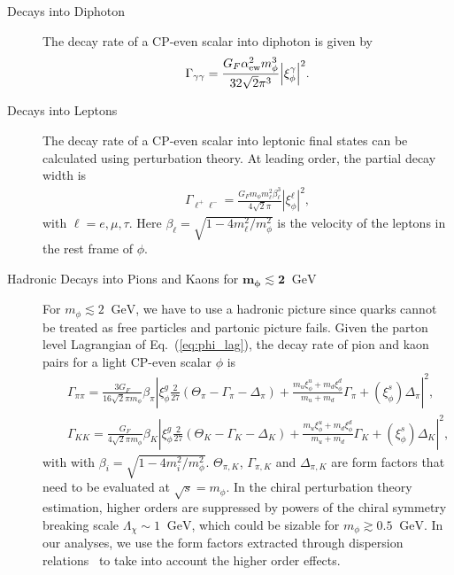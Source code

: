 \documentclass[letterpaper,11pt]{article}
\newcommand{\be}{\begin{equation}\begin{aligned}}
\newcommand{\ee}{\end{aligned}\end{equation}}
\newcommand{\gev}{\text{~GeV}}
\def\gev{\textrm{~GeV}}
\begin{document}
\begin{description}
%
\item[Decays into Diphoton]

 The decay rate of a CP-even scalar into diphoton is given by 
\begin{equation}
\Gamma_{ \gamma \gamma}=\frac{G_{F} \alpha_{\rm ew}^{2} m_{\phi}^{3}}{32 \sqrt{2} \pi^{3}}  \Big| \xi_\phi^\gamma
\Big|^{2}.
\label{eq:hgaga}
\end{equation}

\item[Decays into Leptons]
The decay rate of a CP-even scalar into leptonic final states can be calculated using perturbation theory.  At leading order, the partial decay width is~\cite{Winkler:2018qyg} 
%
\be
    \Gamma_{\ell^+ \ell^-} =\frac{G_F m_\phi m_\ell^2\beta_\ell^3 }{4\sqrt{2}\pi}|\xi_\phi^{\ell}|^2,
\ee
with $\ell=e, \mu, \tau$. Here $\beta_\ell=\sqrt{1-4m_\ell^2/m_\phi^2}$ is the velocity of the leptons in the rest frame of $\phi$.  
\item[Hadronic Decays into Pions and Kaons for $\mathbf{m_\phi \lesssim 2}~\gev$]
For $ m_\phi\lesssim 2~\gev$, we have to use a hadronic picture since quarks cannot be treated as free particles and partonic picture fails.   Given the parton level Lagrangian of Eq.~(\ref{eq:phi_lag}), the decay rate of pion and kaon pairs for a light CP-even scalar $\phi$ is~\cite{Donoghue:1990xh}
\begin{eqnarray}
&&\Gamma_{\pi \pi}=\frac{3 G_{F}}{16 \sqrt{2} \pi m_\phi} \beta_{\pi}\left|
\xi^{g}_{\phi}\frac{2}{27}(\Theta_{\pi}-\Gamma_{\pi}-\Delta_{\pi})+
% 
\frac{m_u \xi_{\phi}^{u}+m_d \xi_{\phi}^{d}}{m_u+m_d} \Gamma_{\pi} + (\xi_{\phi}^{s})\Delta_{\pi}
\right|^{2}, \\
&&\Gamma_{K K}=\frac{ G_{F}}{4 \sqrt{2} \pi m_\phi} \beta_{K}\left|
\xi^{g}_{\phi}\frac{2}{27}(\Theta_{K}-\Gamma_{K}-\Delta_{K})+
% 
\frac{m_u \xi_{\phi}^{u}+m_d \xi_{\phi}^{d}}{m_u+m_d} \Gamma_{K} + (\xi_{\phi}^{s})\Delta_{K}
\right|^{2},
\label{eq:width}
\end{eqnarray}
with with $\beta_{i}=\sqrt{1-4 m_{i}^{2} / m_{\phi}^{2}}$.   
$\Theta_{\pi,K}$, $\Gamma_{\pi,K}$ and $\Delta_{\pi,K}$ are form factors that need to be evaluated at $\sqrt{s}=m_{\phi}$.  In the chiral perturbation theory estimation, higher orders are suppressed by powers of the chiral symmetry breaking scale $\Lambda_{\chi} \sim 1~\gev$, which could be sizable for $m_{\phi} \gtrsim 0.5~\gev$.   In our analyses, we use the form factors extracted through dispersion relations~\cite{Winkler:2018qyg, Monin:2018lee} to take into account the higher order effects.   
 


\end{description}
\end{document}
